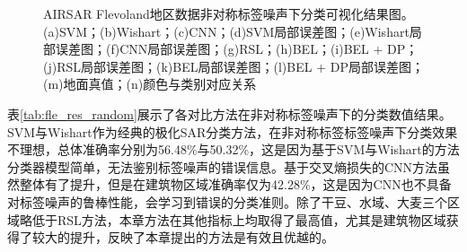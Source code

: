 \begin{figure}[ht!]
    \caption{AIRSAR Flevoland地区数据非对称标签噪声下分类可视化结果图。(a)SVM；(b)Wishart；(c)CNN；(d)SVM局部误差图；(e)Wishart局部误差图；(f)CNN局部误差图；(g)RSL；(h)BEL；(i)BEL + DP；(j)RSL局部误差图；(k)BEL局部误差图；(l)BEL + DP局部误差图；(m)地面真值；(n)颜色与类别对应关系}
    \label{fig:fle_random}
\end{figure}


表\ref{tab:fle_res_random}展示了各对比方法在非对称标签噪声下的分类数值结果。SVM与Wishart作为经典的极化SAR分类方法，在非对称标签标签噪声下分类效果不理想，总体准确率分别为56.48\%与50.32\%，这是因为基于SVM与Wishart的方法分类器模型简单，无法鉴别标签噪声的错误信息。基于交叉熵损失的CNN方法虽然整体有了提升，但是在建筑物区域准确率仅为42.28\%，这是因为CNN也不具备对标签噪声的鲁棒性能，会学习到错误的分类准则。除了干豆、水域、大麦三个区域略低于RSL方法，本章方法在其他指标上均取得了最高值，尤其是建筑物区域获得了较大的提升，反映了本章提出的方法是有效且优越的。

